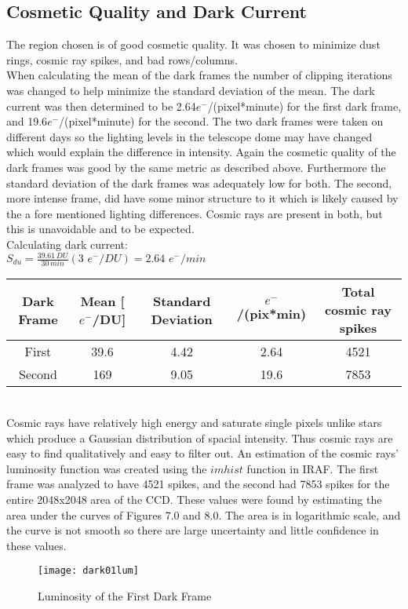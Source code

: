 \documentclass{article}
\begin{document}
\subsection{Cosmetic Quality and Dark Current}
The region chosen is of good cosmetic quality. It was chosen to minimize dust rings, cosmic ray spikes, and bad rows/columns.\\
When calculating the mean of the dark frames the number of clipping iterations was changed to help minimize the standard deviation of the mean. The dark current was then determined to be 2.64$e^-$/(pixel*minute) for the first dark frame, and 19.6$e^-$/(pixel*minute) for the second. The two dark frames were taken on different days so the lighting levels in the telescope dome may have changed which would explain the difference in intensity. Again the cosmetic quality of the dark frames was good by the same metric as described above. Furthermore the standard deviation of the dark frames was adequately low for both. The second, more intense frame, did have some minor structure to it which is likely caused by the a fore mentioned lighting differences. Cosmic rays are present in both, but this is unavoidable and to be expected.\\

Calculating dark current:\\

$S_{du} = \frac{39.61 \, DU}{30 \, min} (3 \, \, e^-/DU) = 2.64 \, \, e^-/min$\\

\begin{tabular}{|c|c|c|c|c|}
\hline
Dark Frame & Mean [$e^-$/DU] & Standard Deviation & $e^-$/(pix*min) & Total cosmic ray spikes \\
\hline
First & 39.6 & 4.42 & 2.64 & 4521 \\
Second & 169 & 9.05 & 19.6 & 7853 \\ 
\hline
\end{tabular}\\

Cosmic rays have relatively high energy and saturate single pixels unlike stars which produce a Gaussian distribution of spacial intensity. Thus cosmic rays are easy to find qualitatively and easy to filter out. An estimation of the cosmic rays' luminosity function was created using the $imhist$ function in IRAF. The first frame was analyzed to have 4521 spikes, and the second had 7853 spikes for the entire 2048x2048 area of the CCD. These values were found by estimating the area under the curves of Figures 7.0 and 8.0. The area is in logarithmic scale, and the curve is not smooth so there are large uncertainty and little confidence in these values.
\begin{figure}
\texttt{[image: dark01lum]} %
\caption{Luminosity of the First Dark Frame}
\end{figure}
\end{document}
